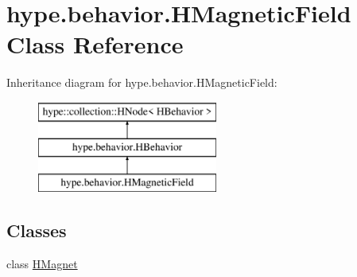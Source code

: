 \hypertarget{classhype_1_1behavior_1_1_h_magnetic_field}{\section{hype.\-behavior.\-H\-Magnetic\-Field Class Reference}
\label{classhype_1_1behavior_1_1_h_magnetic_field}
}
Inheritance diagram for hype.\-behavior.\-H\-Magnetic\-Field\-:\begin{figure}[H]
\begin{center}
\leavevmode
\includegraphics[height=3.000000cm]{classhype_1_1behavior_1_1_h_magnetic_field}
\end{center}
\end{figure}
\subsection*{Classes}
\begin{DoxyCompactItemize}
\item 
class \hyperlink{classhype_1_1behavior_1_1_h_magnetic_field_1_1_h_magnet}{H\-Magnet}
\end{DoxyCompactItemize}

